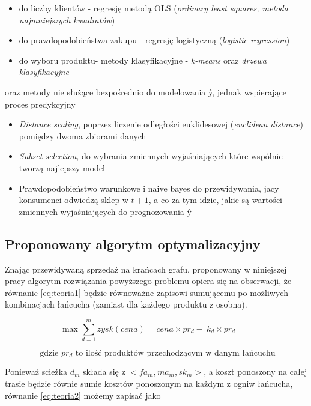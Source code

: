\documentclass{article}
\begin{document}
	\begin{itemize} 
		\item do liczby klientów - regresję metodą OLS (\textit{ordinary least squares, metoda najmniejszych kwadratów})
		\item do prawdopodobieństwa zakupu - regresję logistyczną (\textit{logistic regression})
		\item do wyboru produktu- metody klasyfikacyjne - \textit{k-means} oraz \textit{drzewa klasyfikacyjne}
	\end{itemize}
	oraz metody nie służące bezpośrednio do modelowania \^{y}, jednak wspierające proces predykcyjny
	\begin{itemize} 
		\item \textit{Distance scaling}, poprzez liczenie odległości euklidesowej (\textit{euclidean distance}) pomiędzy dwoma zbiorami danych
		\item \textit{Subset selection}, do wybrania zmiennych wyjaśniających które wspólnie tworzą najlepszy model
		\item Prawdopodobieństwo warunkowe i {naive bayes} do przewidywania, jacy konsumenci odwiedzą sklep w $t+1$, a co za tym idzie, jakie są wartości zmiennych wyjaśniających do prognozowania  \^{y}
	\end{itemize}	


\newpage

\subsection{Proponowany algorytm optymalizacyjny} 
Znając przewidywaną sprzedaż na krańcach grafu, proponowany w niniejszej pracy algorytm rozwiązania powyższego problemu opiera się na obserwacji, że równanie \ref{eq:teoria1} będzie równoważne zapisowi sumującemu po możliwych kombinacjach łańcucha (zamiast dla każdego produktu z osobna).

\begin{equation}  \label{eq:teoria2}
\max \sum\limits_{d=1}^m  zysk(cena) = 
cena \times pr_d -  \ k_d \times pr_d \qquad 
\end{equation}

\begin{equation*}
  \text{ gdzie $pr_d$ to ilość produktów przechodzącym w danym łańcuchu}
\end{equation*}

Ponieważ scieżka $d_m$ składa się z $<fa_m,ma_m,sk_m>$, a koszt ponoszony na całej trasie będzie równie sumie kosztów ponoszonym na każdym z ogniw łańcucha, równanie \ref{eq:teoria2} możemy zapisać jako
\end{document}
